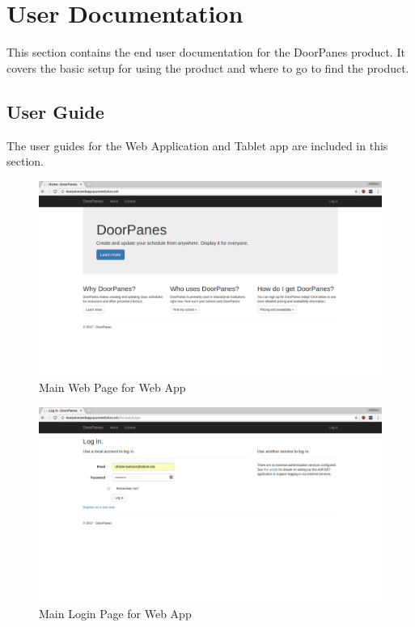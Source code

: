 
\chapter{User Documentation}

This section contains the end user documentation for the DoorPanes product. It covers the basic setup for using the product and where to go to find the product.

\section{User Guide}

The user guides for the Web Application and Tablet app are included in this section.

\begin{figure}
\centering
  \includegraphics[scale=0.3]{DesignImages/UserGuideImagesWebApp/main_page.png}
  \caption{Main Web Page for Web App}
  \label{fig:main_page}
\end{figure}

\begin{figure}
\centering
  \includegraphics[scale=0.3]{DesignImages/UserGuideImagesWebApp/login_page.png}
  \caption{Main Login Page for Web App}
  \label{fig:login_page}
\end{figure}

